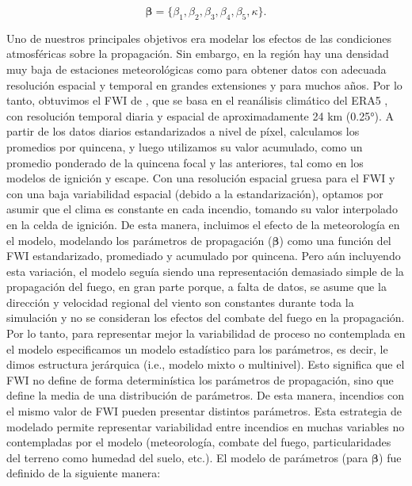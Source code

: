 \begin{equation}\label{eq:spread_params}
    \boldsymbol{\beta} = \{\beta_1, \beta_2, \beta_3, \beta_4, \beta_5, \kappa\}.
\end{equation}

Uno de nuestros principales objetivos era modelar los efectos de las condiciones atmosféricas sobre la propagación. Sin embargo, en la región hay una densidad muy baja de estaciones meteorológicas como para obtener datos con adecuada resolución espacial y temporal en grandes extensiones y para muchos años. Por lo tanto, obtuvimos el FWI de \citet{vitolo_era5-based_2020}, que se basa en el reanálisis climático del ERA5 \citep{hersbach2020era5}, con resolución temporal diaria y espacial de aproximadamente 24 km (0.25°). A partir de los datos diarios estandarizados a nivel de píxel, calculamos los promedios por quincena, y luego utilizamos su valor acumulado, como un promedio ponderado de la quincena focal y las anteriores, tal como en los modelos de ignición y escape. Con una resolución espacial gruesa para el FWI y con una baja variabilidad espacial (debido a la estandarización), optamos por asumir que el clima es constante en cada incendio, tomando su valor interpolado en la celda de ignición. De esta manera, incluimos el efecto de la meteorología en el modelo, modelando los parámetros de propagación ($\boldsymbol{\beta}$) como una función del FWI estandarizado, promediado y acumulado por quincena. Pero aún incluyendo esta variación, el modelo seguía siendo una representación demasiado simple de la propagación del fuego, en gran parte porque, a falta de datos, se asume que la dirección y velocidad regional del viento son constantes durante toda la simulación y no se consideran los efectos del combate del fuego en la propagación. Por lo tanto, para representar mejor la variabilidad de proceso no contemplada en el modelo especificamos un modelo estadístico para los parámetros, es decir, le dimos estructura jerárquica (i.e., modelo mixto o multinivel). Esto significa que el FWI no define de forma determinística los parámetros de propagación, sino que define la media de una distribución de parámetros. De esta manera, incendios con el mismo valor de FWI pueden presentar distintos parámetros. Esta estrategia de modelado permite representar variabilidad entre incendios en muchas variables no contempladas por el modelo (meteorología, combate del fuego, particularidades del terreno como humedad del suelo, etc.). El modelo de parámetros (para $\boldsymbol{\beta}$) fue definido de la siguiente manera:


